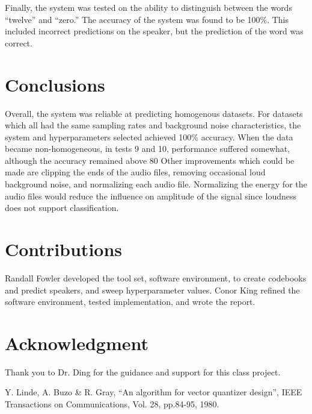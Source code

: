 \documentclass[conference]{IEEEtran}
\begin{document}
    Finally, the system was tested on the ability to distinguish between the words “twelve” and “zero.” The accuracy of the system was found to be 100\%. This included incorrect predictions on the speaker, but the prediction of the word was correct.
    

\section{Conclusions}
Overall, the system was reliable at predicting homogenous datasets. For datasets which all had the same sampling rates and background noise characteristics, the system and hyperparameters selected achieved 100\% accuracy. When the data became non-homogeneous, in tests 9 and 10, performance suffered somewhat, although the accuracy remained above 80%
Other improvements which could be made are clipping the ends of the audio files, removing occasional loud background noise, and normalizing each audio file. Normalizing the energy for the audio files would reduce the influence on amplitude of the signal since loudness does not support classification.

\section*{Contributions}
Randall Fowler developed the tool set, software environment, to create codebooks and predict speakers, and sweep hyperparameter values. Conor King refined the software environment, tested implementation, and wrote the report.
\section*{Acknowledgment}
Thank you to Dr. Ding for the guidance and support for this class project.

\begin{thebibliography}{1}
    
    
    Y. Linde, A. Buzo \& R. Gray, “An algorithm for vector quantizer design”, IEEE Transactions on Communications, Vol.
28, pp.84-95, 1980.
    
    
\end{thebibliography}
\end{document}
